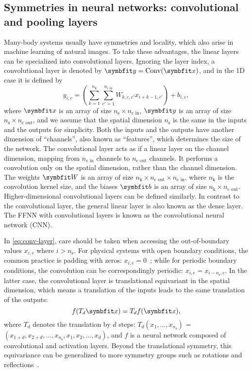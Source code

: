 \subsection{Symmetries in neural networks: convolutional and pooling layers}

Many-body systems usually have symmetries and locality, which also arise in machine learning of natural images. To take these advantages, the linear layers can be specialized into convolutional layers. Ignoring the layer index, a convolutional layer is denoted by $\vy = \text{Conv}(\vx)$, and in the 1D case it is defined by
\begin{equation}
y_{i, c} = \left( \sum_{k = 1}^{n_\text{k}} \sum_{c' = 1}^{n_\text{c in}} W_{k, c, c'} x_{i + k - 1, c'} \right) + b_{i, c},
\label{eq:conv-layer}
\end{equation}
where $\vx$ is an array of size $n_\text{s} \times n_\text{c in}$, $\vy$ is an array of size $n_\text{s} \times n_\text{c out}$, and we assume that the spatial dimension $n_\text{s}$ is the same in the inputs and the outputs for simplicity. Both the inputs and the outputs have another dimension of ``channels'', also known as ``features'', which determines the size of the network. The convolutional layer acts as if a linear layer on the channel dimension, mapping from $n_\text{c in}$ channels to $n_\text{c out}$ channels. It performs a convolution only on the spatial dimension, rather than the channel dimension. The weights $\mW$ is an array of size $n_\text{k} \times n_\text{c out} \times n_\text{c in}$, where $n_\text{k}$ is the convolution kernel size, and the biases $\vb$ is an array of size $n_\text{k} \times n_\text{c out}$. Higher-dimensional convolutional layers can be defined similarly. In contrast to the convolutional layer, the general linear layer is also known as the dense layer. The FFNN with convolutional layers is known as the convolutional neural network (CNN).

In \cref{eq:conv-layer}, care should be taken when accessing the out-of-boundary values $x_{i, c}$ where $i > n_\text{s}$. For physical systems with open boundary conditions, the common practice is padding with zeros: $x_{i, c} = 0$~\cite{islam2020much}; while for periodic boundary conditions, the convolution can be correspondingly periodic: $x_{i, c} = x_{i - n_\text{s}, c}$. In the latter case, the convolutional layer is translational equivariant in the spatial dimension, which means a translation of the inputs leads to the same translation of the outputs:
\begin{equation}
f(T_d \vx) = T_d f(\vx),
\end{equation}
where $T_d$ denotes the translation by $d$ steps: $T_d (x_1, \ldots, x_{n_\text{s}})$ = $(x_{1 + d}, x_{2 + d}, \ldots, x_{n_\text{s}}, x_1, x_2, \ldots, x_d)$, and $f$ is a neural network composed of convolutional and activation layers. Beyond the translational symmetry, this equivariance can be generalized to more symmetry groups such as rotations and reflections~\cite{luo2021gauge, roth2021group}.

